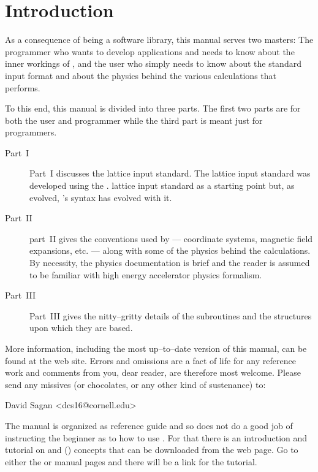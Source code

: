 \section*{Introduction}

As a consequence of \bmad being a software library, this manual serves two masters: The
programmer who wants to develop applications and needs to know about the inner workings of
\bmad, and the user who simply needs to know about the \bmad standard input format and
about the physics behind the various calculations that \bmad performs.

To this end, this manual is divided into three parts. The first two
parts are for both the user and programmer while the third part is
meant just for programmers. 
  \begin{description}
  \item[Part~I] \Newline
Part~I discusses the \bmad lattice input standard. The \bmad lattice input standard was
developed using the \mad\cite{b:maduser,b:madphysics}. lattice input standard as a
starting point but, as \bmad evolved, \bmad's syntax has evolved with it.
  \item[Part~II] \Newline
part~II gives the conventions used by \bmad --- coordinate systems, magnetic field
expansions, etc. --- along with some of the physics behind the calculations. By necessity,
the physics documentation is brief and the reader is assumed to be familiar with high
energy accelerator physics formalism.
  \item[Part~III] \Newline
Part~III gives the nitty--gritty details of the \bmad
subroutines and the structures upon which they are based.
\end{description}

More information, including the most up--to--date version of this manual, can be found at
the \bmad web site\cite{b:bmad.web}.  Errors and omissions are a fact of life for any
reference work and comments from you, dear reader, are therefore most welcome. Please send
any missives (or chocolates, or any other kind of sustenance) to:
\begin{example}
  David Sagan <dcs16@cornell.edu>
\end{example}

The \bmad manual is organized as reference guide and so does not do a good job of instructing the
beginner as to how to use \bmad. For that there is an introduction and tutorial on \bmad and \tao
() concepts that can be downloaded from the \bmad web page. Go to either the \bmad or
\tao manual pages and there will be a link for the tutorial.

